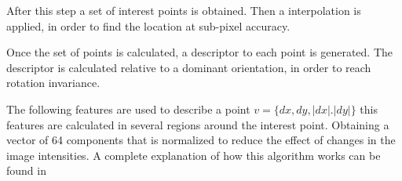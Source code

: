 After this step a set of interest points is obtained. Then a interpolation is applied, in order to find the location 
at sub-pixel accuracy.

Once the set of points is calculated, a descriptor to each point is generated. The descriptor is calculated relative to a dominant 
orientation, in order to reach rotation invariance.
 
The following features are used to describe a point $v=\{dx,dy,|dx|.|dy|\}$ this features are calculated in several regions 
around the interest point. Obtaining a vector of 64 components that is normalized to reduce the effect of changes in the image 
intensities. A complete explanation of how this algorithm works can be found in \cite{OpenSURF}


